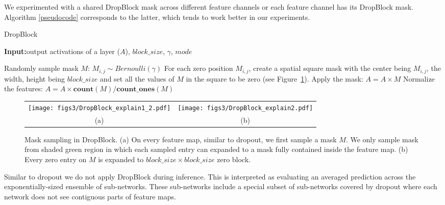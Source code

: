 \documentclass{article}
\begin{document}
We experimented with a shared DropBlock mask across different feature channels or each feature channel has its DropBlock mask. Algorithm \ref{pseudocode} corresponds to the latter, which tends to work better in our experiments.

\begin{algorithm}[t!]
\renewcommand{\algorithmicrequire}{\textbf{Input:}}
\renewcommand{\algorithmicensure}{\textbf{Output:}}
\caption{DropBlock}\label{pseudocode}
\begin{algorithmic}[1]
\State \algorithmicrequire output activations of a layer ($A$), ${block\_size}$, $\gamma$, $mode$


\EndIf

\State Randomly sample mask $M$: $M_{i,j} \sim Bernoulli(\gamma)$
\State For each zero position $M_{i,j}$, create a spatial square  mask with the center being $M_{i,j}$, the width, height being $block\_size$ and set all the values of $M$ in the square to be zero (see Figure~\ref{fig:expand}).
\State Apply the mask: $A = A \times {M}$
\State Normalize the features: $A = A \times \textbf{count} ({M}) / \textbf{count\_ones} (M)$
\end{algorithmic}
\end{algorithm}

\begin{figure}[t!]
  \centering
  \begin{tabular}{cc}
      \texttt{[image: figs3/DropBlock\_explain1\_2.pdf]}&
      \texttt{[image: figs3/DropBlock\_explain2.pdf]}\\
      (a) & (b)\\
  \end{tabular}
  
  \caption{Mask sampling in DropBlock. (a) On every feature map, similar to dropout, we first sample a mask $M$. We only sample mask from shaded green region in which each sampled entry can expanded to a mask fully contained inside the feature map. (b) Every zero entry on $M$ is expanded to $block\_size \times block\_size$ zero block.}
  \label{fig:expand}
\end{figure}

Similar to dropout we do not apply DropBlock during inference. This is interpreted as evaluating
an averaged prediction across the exponentially-sized ensemble of sub-networks. These
sub-networks include a special subset of sub-networks covered by dropout where each network
does not see contiguous parts of feature maps.
\end{document}
